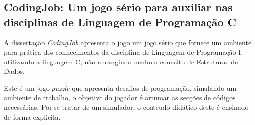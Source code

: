 \subsection{CodingJob: Um jogo sério para auxiliar nas disciplinas de Linguagem de Programação C}

A dissertação \textit{CodingJob} apresenta o jogo um jogo sério que fornece um ambiente para prática dos conhecimentos da disciplina de Linguagem de Programação I utilizando a linguagem C, não abrangindo nenhum conceito de Estruturas de Dados.

Este é um jogo \emph{puzzle} que apresenta desafios de programação, simulando um ambiente de trabalho, o objetivo do jogador é arrumar as secções de códigos necessárias. Por se tratar de um simulador, o conteudo didático deste é ensinado de forma explicita. \cite{costa2023condigjob}



